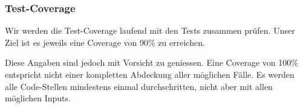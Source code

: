 \documentclass[a4paper]{article}
\begin{document}
\subsubsection{Test-Coverage}

Wir werden die Test-Coverage laufend mit den Tests zusammen prüfen.
Unser Ziel ist es jeweils eine Coverage von 90\% zu erreichen.

Diese Angaben sind jedoch mit Vorsicht zu geniessen.
Eine Coverage von 100\% entspricht nicht einer kompletten Abdeckung aller möglichen Fälle.
Es werden alle Code-Stellen mindestens einmal durchschritten, nicht aber mit allen möglichen Inputs.
\end{document}
